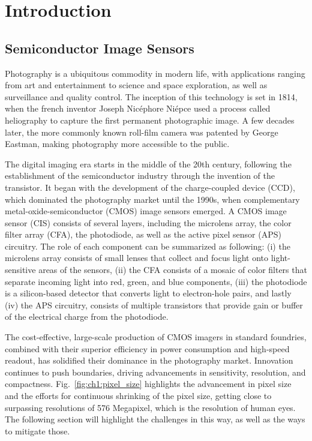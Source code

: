 \chapter{Introduction}\label{ch:introduction}

\section{Semiconductor Image Sensors}

Photography is a ubiquitous commodity in modern life, with applications ranging from art and entertainment to science and space exploration, as well as surveillance and quality control. The inception of this technology is set in 1814, when the french inventor Joseph Nicéphore Niépce used a process called heliography to capture the first permanent photographic image. A few decades later, the more commonly known roll-film camera was patented by George Eastman, making photography more accessible to the public.

The digital imaging era starts in the middle of the 20th century, following the establishment of the semiconductor industry through the invention of the transistor. It began with the development of the charge-coupled device (CCD), which dominated the photography market until the 1990s, when complementary metal-oxide-semiconductor (CMOS) image sensors emerged. A CMOS image sensor (CIS) consists of several layers, including the microlens array, the color filter array (CFA), the photodiode, as well as the active pixel sensor (APS) circuitry. The role of each component can be summarized as following: (i) the microlens array consists of small lenses that collect and focus light onto light-sensitive areas of the sensors, (ii) the CFA consists of a mosaic of color filters that separate incoming light into red, green, and blue components, (iii) the photodiode is a silicon-based detector that converts light to electron-hole pairs, and lastly (iv) the APS circuitry, consists of multiple transistors that provide gain or buffer of the electrical charge from the photodiode.


The cost-effective, large-scale production of CMOS imagers in standard foundries, combined with their superior efficiency in power consumption and high-speed readout, has solidified their dominance in the photography market. Innovation continues to push boundaries, driving advancements in sensitivity, resolution, and compactness. Fig.~\ref{fig:ch1:pixel_size} highlights the advancement in pixel size and the efforts for continuous shrinking of the pixel size, getting close to surpassing resolutions of 576 Megapixel, which is the resolution of human eyes. The following section will highlight the challenges in this way, as well as the ways to mitigate those. 


